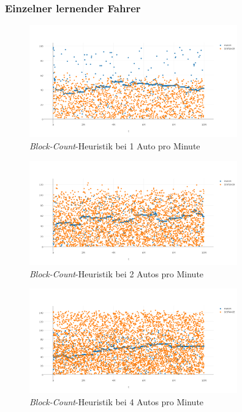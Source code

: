 \subsubsection*{Einzelner lernender Fahrer}
\begin{figure}[H]
	\includegraphics[width=0.8\textwidth]{analyse/SingleMutant/blockcount1.png}
	\caption{\emph{Block-Count}-Heuristik bei 1 Auto pro Minute}\label{fig:ap_sm_bc_1}
\end{figure}
\begin{figure}[H]
	\includegraphics[width=0.8\textwidth]{analyse/SingleMutant/blockcount2.png}
	\caption{\emph{Block-Count}-Heuristik bei 2 Autos pro Minute}\label{fig:ap_sm_bc_2}
\end{figure}
\begin{figure}[H]
	\includegraphics[width=0.8\textwidth]{analyse/SingleMutant/blockcount4.png}
	\caption{\emph{Block-Count}-Heuristik bei 4 Autos pro Minute}\label{fig:ap_sm_bc_4}
\end{figure}
